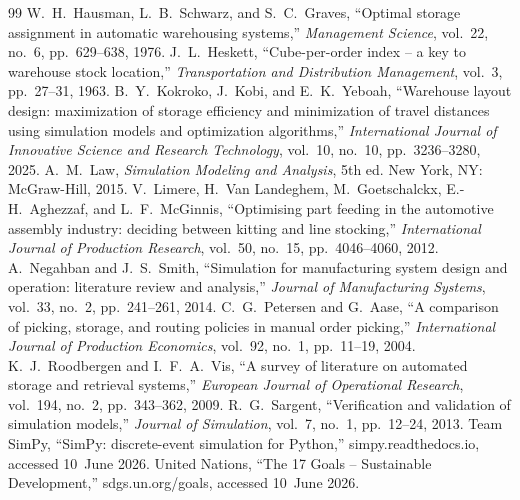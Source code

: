 \documentclass[12pt,a4paper]{article}
\begin{document}
\begin{thebibliography}{99}
 W.~H.~Hausman, L.~B.~Schwarz, and S.~C.~Graves, ``Optimal storage assignment in automatic warehousing systems,'' \textit{Management Science}, vol.~22, no.~6, pp.~629--638, 1976.
 J.~L.~Heskett, ``Cube-per-order index -- a key to warehouse stock location,'' \textit{Transportation and Distribution Management}, vol.~3, pp.~27--31, 1963.
 B.~Y.~Kokroko, J.~Kobi, and E.~K.~Yeboah, ``Warehouse layout design: maximization of storage efficiency and minimization of travel distances using simulation models and optimization algorithms,'' \textit{International Journal of Innovative Science and Research Technology}, vol.~10, no.~10, pp.~3236--3280, 2025.
 A.~M.~Law, \textit{Simulation Modeling and Analysis}, 5th ed. New York, NY: McGraw-Hill, 2015.
 V.~Limere, H.~Van Landeghem, M.~Goetschalckx, E.-H.~Aghezzaf, and L.~F.~McGinnis, ``Optimising part feeding in the automotive assembly industry: deciding between kitting and line stocking,'' \textit{International Journal of Production Research}, vol.~50, no.~15, pp.~4046--4060, 2012.
 A.~Negahban and J.~S.~Smith, ``Simulation for manufacturing system design and operation: literature review and analysis,'' \textit{Journal of Manufacturing Systems}, vol.~33, no.~2, pp.~241--261, 2014.
 C.~G.~Petersen and G.~Aase, ``A comparison of picking, storage, and routing policies in manual order picking,'' \textit{International Journal of Production Economics}, vol.~92, no.~1, pp.~11--19, 2004.
 K.~J.~Roodbergen and I.~F.~A.~Vis, ``A survey of literature on automated storage and retrieval systems,'' \textit{European Journal of Operational Research}, vol.~194, no.~2, pp.~343--362, 2009.
 R.~G.~Sargent, ``Verification and validation of simulation models,'' \textit{Journal of Simulation}, vol.~7, no.~1, pp.~12--24, 2013.
 Team SimPy, ``SimPy: discrete-event simulation for Python,'' simpy.readthedocs.io, accessed 10~June 2026.
 United Nations, ``The 17 Goals -- Sustainable Development,'' sdgs.un.org/goals, accessed 10~June 2026.
\end{thebibliography}

\appendix
\end{document}
